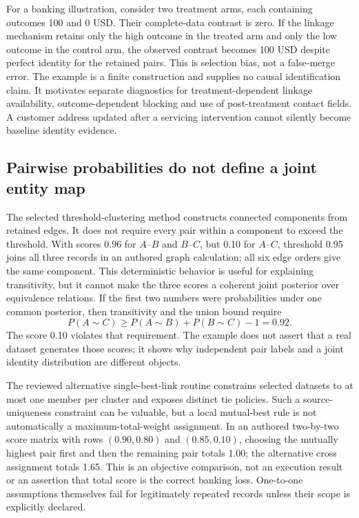 For a banking illustration, consider two treatment arms, each containing outcomes 100 and 0 USD. Their complete-data contrast is zero. If the linkage mechanism retains only the high outcome in the treated arm and only the low outcome in the control arm, the observed contrast becomes 100 USD despite perfect identity for the retained pairs. This is selection bias, not a false-merge error. The example is a finite construction and supplies no causal identification claim. It motivates separate diagnostics for treatment-dependent linkage availability, outcome-dependent blocking and use of post-treatment contact fields. A customer address updated after a servicing intervention cannot silently become baseline identity evidence.~\citep{exec24_splink_contract}

\subsection{Pairwise probabilities do not define a joint entity map}
The selected threshold-clustering method constructs connected components from retained edges. It does not require every pair within a component to exceed the threshold. With scores 0.96 for $A$--$B$ and $B$--$C$, but 0.10 for $A$--$C$, threshold 0.95 joins all three records in an authored graph calculation; all six edge orders give the same component. This deterministic behavior is useful for explaining transitivity, but it cannot make the three scores a coherent joint posterior over equivalence relations. If the first two numbers were probabilities under one common posterior, then transitivity and the union bound require
\[P(A\sim C)\geq P(A\sim B)+P(B\sim C)-1=0.92.\]
The score 0.10 violates that requirement. The example does not assert that a real dataset generates those scores; it shows why independent pair labels and a joint identity distribution are different objects.~\citep{exec24_splink_sources,exec24_splink_contract}

The reviewed alternative single-best-link routine constrains selected datasets to at most one member per cluster and exposes distinct tie policies. Such a source-uniqueness constraint can be valuable, but a local mutual-best rule is not automatically a maximum-total-weight assignment. In an authored two-by-two score matrix with rows $(0.90,0.80)$ and $(0.85,0.10)$, choosing the mutually highest pair first and then the remaining pair totals 1.00; the alternative cross assignment totals 1.65. This is an objective comparison, not an execution result or an assertion that total score is the correct banking loss. One-to-one assumptions themselves fail for legitimately repeated records unless their scope is explicitly declared.~\citep{exec24_splink_sources,exec24_splink_contract}

